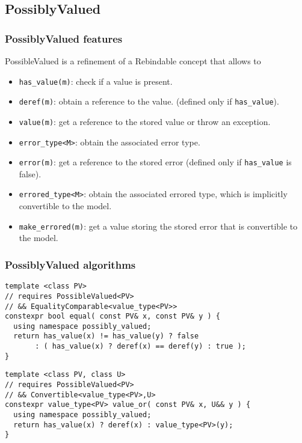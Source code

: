 \documentclass[xcolor=dvipsnames]{beamer}
\newcommand{\cpp}[1]{\lstinline{#1}}
\begin{document}
\subsection{PossiblyValued}
\begin{frame}[fragile]
\frametitle{PossiblyValued features}

PossibleValued is a refinement of a Rebindable  concept that allows to

\begin{itemize}
  \item \cpp{has_value(m)}: check if a value is present.
  \item \cpp{deref(m)}: obtain a reference to the value. (defined only if \cpp{has_value}).
  \item \cpp{value(m)}: get a reference to the stored value or throw an exception.
  
  \item \cpp{error_type<M>}: obtain the associated error type.
  \item \cpp{error(m)}: get a reference to the stored error (defined only if \cpp{has_value} is false).
  
  \item \cpp{errored_type<M>}: obtain the associated errored type, which is implicitly convertible to the model.
  \item \cpp{make_errored(m)}: get a value storing the stored error that is convertible to the model. 
 
\end{itemize}
\end{frame}
\begin{frame}[fragile]
\frametitle{PossiblyValued algorithms}

\begin{lstlisting}
template <class PV> 
// requires PossibleValued<PV> 
// && EqualityComparable<value_type<PV>>
constexpr bool equal( const PV& x, const PV& y ) {
  using namespace possibly_valued;
  return has_value(x) != has_value(y) ? false 
       : ( has_value(x) ? deref(x) == deref(y) : true );
}
\end{lstlisting}

\begin{lstlisting}
template <class PV, class U> 
// requires PossibleValued<PV> 
// && Convertible<value_type<PV>,U>
constexpr value_type<PV> value_or( const PV& x, U&& y ) {
  using namespace possibly_valued;
  return has_value(x) ? deref(x) : value_type<PV>(y); 
}
\end{lstlisting}

\end{frame}
\end{document}
